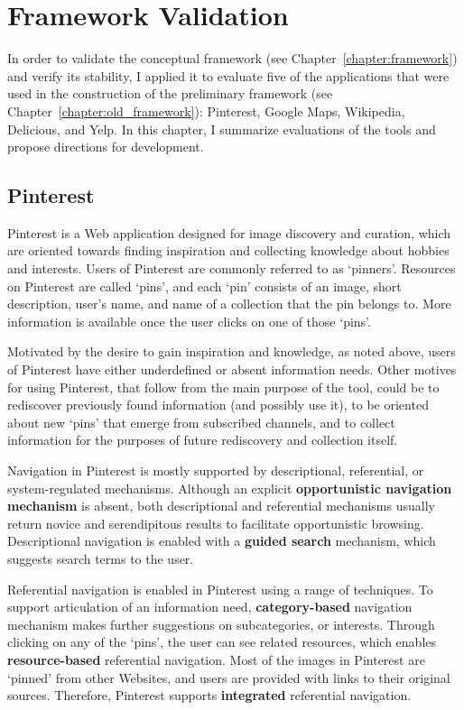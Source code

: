 \chapter{Framework Validation}
\label{chapter:evaluation}

In order to validate the conceptual framework (see Chapter~\ref{chapter:framework}) and verify its stability, I applied it to evaluate five of the applications that were used in the construction of the preliminary framework (see Chapter~\ref{chapter:old_framework}): Pinterest, Google Maps, Wikipedia, Delicious, and Yelp. In this chapter, I summarize evaluations of the tools and propose directions for development. 

{\section{Pinterest}
Pinterest is a Web application designed for image discovery and curation, which are oriented towards finding inspiration and collecting knowledge about hobbies and interests.  Users of Pinterest are commonly referred to as `pinners'. Resources on Pinterest are called `pins', and each `pin' consists of an image, short description, user's name, and name of a collection that the pin belongs to. More information is available once the user clicks on one of those `pins'.

Motivated by the desire to gain inspiration and knowledge, as noted above, users of Pinterest have either underdefined or absent information needs. Other motives for using Pinterest, that follow from the main purpose of the tool, could be to rediscover previously found information (and possibly use it), to be oriented about new `pins' that emerge from subscribed channels, and to collect information for the purposes of future rediscovery and collection itself.

Navigation in Pinterest is mostly supported by descriptional, referential, or system-regulated mechanisms. Although an explicit \textbf{opportunistic navigation mechanism} is absent, both descriptional and referential mechanisms usually return novice and serendipitous results to facilitate opportunistic browsing. Descriptional navigation is enabled with a \textbf{guided search} mechanism, which suggests search terms to the user. 

Referential navigation is enabled in Pinterest using a range of techniques. To support articulation of an information need, \textbf{category-based} navigation mechanism makes further suggestions on subcategories, or interests. Through clicking on any of the `pins', the user can see related resources, which enables \textbf{resource-based} referential navigation. Most of the images in Pinterest are `pinned' from other Websites, and users are provided with links to their original sources. Therefore, Pinterest supports \textbf{integrated} referential navigation.

}
